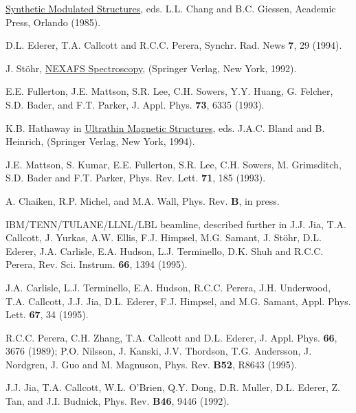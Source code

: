 \batchmode

\makeatletter

\makeatother
\newenvironment{tex2html_wrap}{}{}
\newwrite\lthtmlwrite
\def\lthtmltypeout#1{{\let\protect\string\immediate\write\lthtmlwrite{#1}}}%
\newbox\sizebox

\pagestyle{empty}
{\newpage
\clearpage
\samepage \begin{references} \underline{Synthetic Modulated Structures},
eds. L.L. Chang and B.C. Giessen, Academic Press, Orlando (1985).

 D.L. Ederer, T.A. Callcott and R.C.C. Perera,
Synchr. Rad. News {\bf 7}, 29 (1994).

J. St\"ohr, \underline{NEXAFS Spectroscopy}, (Springer Verlag, New
York, 1992).

 E.E. Fullerton, J.E. Mattson, S.R. Lee,
C.H. Sowers, Y.Y. Huang, G. Felcher, S.D. Bader, and F.T. Parker,
J. Appl. Phys. {\bf 73}, 6335 (1993).

 K.B. Hathaway in \underline{Ultrathin Magnetic
Structures}, eds. J.A.C. Bland and B. Heinrich, (Springer Verlag, New
York, 1994).

 J.E. Mattson, S. Kumar, E.E. Fullerton, S.R. Lee,
C.H. Sowers, M. Grimsditch, S.D. Bader and F.T. Parker,
Phys. Rev. Lett. {\bf 71}, 185 (1993).

 A. Chaiken, R.P. Michel, and M.A. Wall,
Phys. Rev. {\bf B}, in press.

 IBM/TENN/TULANE/LLNL/LBL beamline, described
further in J.J. Jia, T.A. Callcott, J. Yurkas, A.W. Ellis,
F.J. Himpsel, M.G. Samant, J. St\"ohr, D.L. Ederer, J.A. Carlisle,
E.A. Hudson, L.J. Terminello, D.K. Shuh and R.C.C. Perera,
Rev. Sci. Instrum. {\bf 66}, 1394 (1995).

 J.A. Carlisle, L.J. Terminello, E.A. Hudson,
R.C.C. Perera, J.H. Underwood, T.A. Callcott, J.J. Jia, D.L. Ederer,
F.J. Himpsel, and M.G. Samant, Appl. Phys. Lett. {\bf 67}, 34 (1995).

  R.C.C. Perera, C.H. Zhang, T.A. Callcott and D.L.
Ederer, J. Appl. Phys. {\bf 66}, 3676 (1989); P.O. Nilsson, J. Kanski,
J.V. Thordson, T.G.  Andersson, J. Nordgren, J. Guo and M. Magnuson,
Phys. Rev. {\bf B52}, R8643 (1995).

 J.J. Jia, T.A. Callcott, W.L. O'Brien, Q.Y. Dong,
D.R. Muller, D.L. Ederer, Z. Tan, and J.I. Budnick, Phys. Rev. {\bf
B46}, 9446 (1992).


\end{references}}
